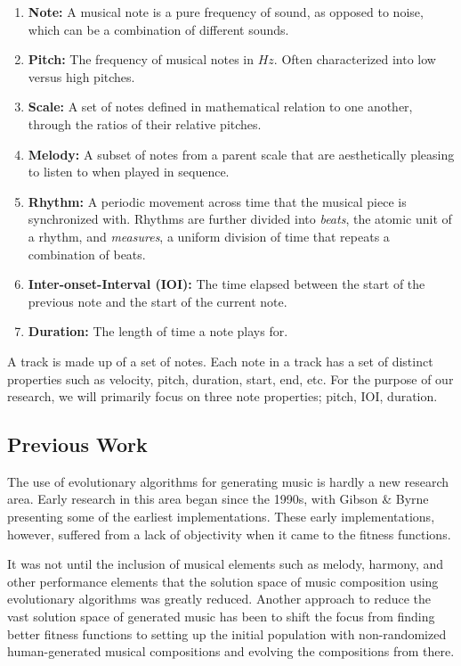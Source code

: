 \documentclass[conference]{IEEEtran}
\begin{document}
\begin{enumerate}
    \item \textbf{Note:} A musical note is a pure frequency of sound, as opposed to noise, which can be a combination of different sounds.
    \item \textbf{Pitch:} The frequency of musical notes in $Hz$. Often characterized into low versus high pitches.
    \item \textbf{Scale:} A set of notes defined in mathematical relation to one another, through the ratios of their relative pitches. 
    \item \textbf{Melody:} A subset of notes from a parent scale that are aesthetically pleasing to listen to when played in sequence.
    \item \textbf{Rhythm:} A periodic movement across time that the musical piece is synchronized with. Rhythms are further divided into \textit{beats}, the atomic unit of a rhythm, and \textit{measures}, a uniform division of time that repeats a combination of beats.
    \item \textbf{Inter-onset-Interval (IOI):} The time elapsed between the start of the previous note and the start of the current note.
    \item \textbf{Duration:} The length of time a note plays for.
\end{enumerate}

A track is made up of a set of notes. Each note in a track has a set of distinct properties such as velocity, pitch, duration, start, end, etc. For the purpose of our research, we will primarily focus on three note properties; pitch, IOI, duration. 

\subsection{Previous Work}

The use of evolutionary algorithms for generating music is hardly a new research area. Early research in this area began since the 1990s, with Gibson \& Byrne\cite{1991} presenting some of the earliest implementations. These early implementations, however, suffered from a lack of objectivity when it came to the fitness functions.

It was not until the inclusion of musical elements such as melody\cite{b4}, harmony\cite{harmony}, and other performance elements that the solution space of music composition using evolutionary algorithms was greatly reduced. Another approach to reduce the vast solution space of generated music has been to shift the focus from finding better fitness functions to setting up the initial population with non-randomized human-generated musical compositions and evolving the compositions from there\cite{nonrandom}.
\end{document}
